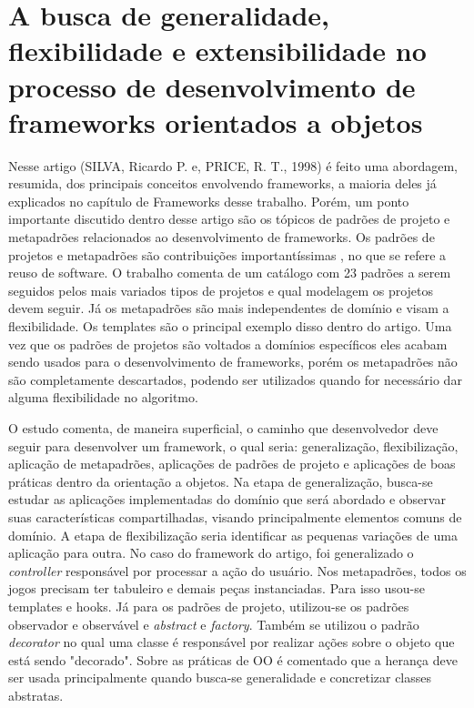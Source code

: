 \documentclass[
    12pt,       %
    openright,      %
    twoside,      %
    a4paper,      %
    english,      %
    french,       %
    spanish,      %
    brazil,       %
    ]{abntex2}
\begin{document}
    \section{A busca de generalidade, flexibilidade e extensibilidade no processo de desenvolvimento de frameworks orientados a objetos}
      Nesse artigo (SILVA, Ricardo P. e, PRICE, R. T., 1998) é feito uma abordagem, resumida, dos principais conceitos envolvendo frameworks, a
      maioria deles já explicados no capítulo de Frameworks desse trabalho. Porém, um ponto importante
      discutido dentro desse artigo são os tópicos de padrões de projeto e metapadrões relacionados
      ao desenvolvimento de frameworks. Os padrões de projetos e metapadrões são contribuições
      importantíssimas , no que se refere a reuso de software. O trabalho comenta de um catálogo com
      23 padrões a serem seguidos pelos mais variados tipos de projetos e qual modelagem os projetos devem
      seguir. Já os metapadrões são mais independentes de domínio e visam a flexibilidade. Os templates são o
      principal exemplo disso dentro do artigo. Uma vez que os padrões de projetos são voltados a domínios
      específicos eles acabam sendo usados para o desenvolvimento de frameworks, porém os metapadrões não são
      completamente descartados, podendo ser utilizados quando for necessário dar alguma flexibilidade no
      algoritmo.

      O estudo comenta, de maneira superficial, o caminho que desenvolvedor deve seguir para desenvolver um
      framework, o qual seria: generalização, flexibilização, aplicação de metapadrões, aplicações de padrões
      de projeto e aplicações de boas práticas dentro da orientação a objetos.
      Na etapa de generalização, busca-se estudar as aplicações implementadas do domínio que será abordado
      e observar suas características compartilhadas, visando principalmente elementos comuns de domínio. A
      etapa de flexibilização seria identificar as pequenas variações de uma aplicação para outra. No caso do
      framework do artigo, foi generalizado o \textit{controller} responsável por processar a ação do usuário.
      Nos metapadrões, todos os jogos precisam ter tabuleiro e demais peças instanciadas. Para isso usou-se
      templates e hooks. Já para os padrões de projeto, utilizou-se os padrões observador e observável e
      \textit{abstract} e \textit{factory}. Também se utilizou o padrão \textit{decorator} no qual uma
      classe é responsável por realizar ações sobre o objeto que está sendo "decorado". Sobre as práticas
      de OO é comentado que a herança deve ser usada principalmente quando busca-se generalidade e concretizar classes abstratas.
\end{document}
